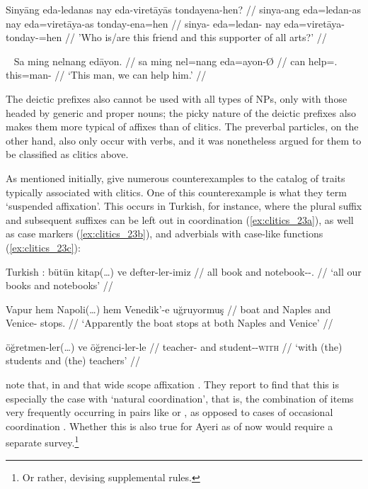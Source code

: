\a\label{ex:clitics_21b}\begingl
	\gla Sinyāng eda-ledanas nay eda-viretāyās tondayena-hen? //
	\glb sinya-ang eda=ledan-as nay eda=viretāya-as tonday-ena=hen //
	\glc sinya-\Aarg{} eda=ledan-\Parg{} nay eda=viretāya-\Parg{} 
		tonday-\Gen{}=hen //
	\glft 'Who is/are this friend and this supporter of all arts?' //
\endgl
\xe

\ex~\label{ex:clitics_22}\begingl
	\gla Sa ming nelnang edāyon. //
	\glb sa ming nel=nang eda=ayon-Ø //
	\glc \Parg{} can help=\Fpl{}.\Aarg{} this=man-\Top{} //
	\glft `This man, we can help him.' //
\endgl\xe

The deictic prefixes also cannot be used with all types of NPs, only with those
headed by generic and proper nouns; the picky nature of the deictic prefixes
also makes them more typical of affixes than of clitics. The preverbal
particles, on the other hand, also only occur with verbs, and it was 
nonetheless argued for them to be classified as clitics above.

As mentioned initially, \citet{spencerluis2012} give numerous counterexamples
to the catalog of traits typically associated with clitics. One of this
counterexample is what they term `suspended affixation'. This occurs in
Turkish, for instance, where the plural suffix  and subsequent
suffixes can be left out in coordination (\ref{ex:clitics_23a}), as well as
case markers (\ref{ex:clitics_23b}), and adverbials with case-like functions
(\ref{ex:clitics_23c}):

\pex\label{ex:clitics_23}
Turkish \citep[199]{spencerluis2012}:
\a\label{ex:clitics_23a}\begingl
	\gla bütün kitap(…) ve defter-ler-imiz //
	\glb all book and notebook-\Pl{}-\Fpl{}.\Poss{} //
	\glft `all our books and notebooks' //
\endgl

\a\label{ex:clitics_23b}\begingl
	\gla Vapur hem Napoli(…) hem Venedik'-e uğruyormuş //
	\glb boat and Naples and Venice-\Loc{} stops.\Evid{} //
	\glft `Apparently the boat stops at both Naples and Venice' //
\endgl

\a\label{ex:clitics_23c}\begingl
	\gla öğretmen-ler(…) ve öğrenci-ler-le //
	\glb teacher-\Pl{} and student-\Pl{}-\textsc{with} //
	\glft `with (the) students and (the) teachers' //
\endgl
\xe

\citet{spencerluis2012} note that, in  and that wide scope affixation . They report \citet{wälchli2005} to find that this
is especially the case with `natural coordination', that is, the combination of
items very frequently occurring in pairs like  or
, as opposed to cases of occasional coordination 
\citep[200]{spencerluis2012}. Whether this is also true for Ayeri as of now
would require a separate survey.\footnote{Or rather, devising supplemental
rules.}

